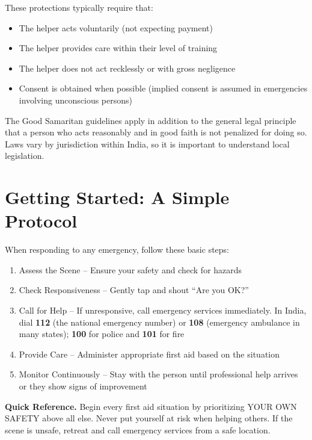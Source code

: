 These protections typically require that:

\begin{itemize}[leftmargin=*]
  \item The helper acts voluntarily (not expecting payment)
  \item The helper provides care within their level of training
  \item The helper does not act recklessly or with gross negligence
  \item Consent is obtained when possible (implied consent is assumed in emergencies involving unconscious persons)
\end{itemize}

The Good Samaritan guidelines apply in addition to the general legal principle that a person who acts reasonably and in good faith is not penalized for doing so. Laws vary by jurisdiction within India, so it is important to understand local legislation.


\section{Getting Started: A Simple Protocol}

When responding to any emergency, follow these basic steps:

\begin{enumerate}[leftmargin=*]
\item Assess the Scene -- Ensure your safety and check for hazards
\item Check Responsiveness -- Gently tap and shout ``Are you OK?''
\item Call for Help -- If unresponsive, call emergency services immediately. In India, dial \textbf{112} (the national emergency number) or \textbf{108} (emergency ambulance in many states); \textbf{100} for police and \textbf{101} for fire
\item Provide Care -- Administer appropriate first aid based on the situation
\item Monitor Continuously -- Stay with the person until professional help arrives or they show signs of improvement
\end{enumerate}
\medskip\noindent\textbf{Quick Reference.}
Begin every first aid situation by prioritizing YOUR OWN SAFETY above all else. Never put yourself at risk when helping others. If the scene is unsafe, retreat and call emergency services from a safe location.


